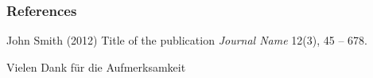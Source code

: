 \documentclass{beamer}
\begin{document}

\begin{frame}
\frametitle{References}
\footnotesize{
\begin{thebibliography}{99} %
 John Smith (2012)
\newblock Title of the publication
\newblock \emph{Journal Name} 12(3), 45 -- 678.
\end{thebibliography}
}
\end{frame}


\begin{frame}
\Huge{\centerline{Vielen Dank für die Aufmerksamkeit}}
\end{frame}

\end{document}

